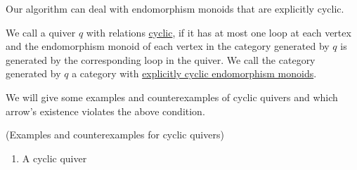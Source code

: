 Our algorithm can deal with endomorphism monoids that are explicitly cyclic.

\begin{definition}\label{def:cyclic_quiver}
We call a quiver $q$ with relations \ul{cyclic}, if it has at most one loop at each vertex and the endomorphism monoid of
each vertex in the category generated by $q$ is generated by the corresponding loop in the quiver. We call the
category generated by $q$ a category with \ul{explicitly cyclic endomorphism monoids}.
\end{definition}

We will give some examples and counterexamples of cyclic quivers and which arrow's existence violates the above condition.

\begin{example}{(Examples and counterexamples for cyclic quivers)}
\begin{enumerate}
\renewcommand{\labelenumi}{(\theenumi)}
\item A cyclic quiver


\end{enumerate}
\end{example}

